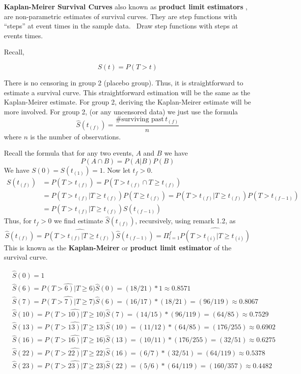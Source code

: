 \documentclass{article}
\begin{document}

 \textbf{Kaplan-Meirer Survival Curves } also known as \textbf{ product limit estimators }, are non-parametric estimates of survival curves. They are step functions with ``steps'' at event times in the sample data.
\NTS \, Draw step functions with steps at events times.

 Recall,

\[
S(t) = P(T>t)
\]

There is no censoring in group 2 (placebo group). Thus, it is straightforward to estimate a survival curve. This straightforward estimation will be the same as the Kaplan-Meirer estimate. For group 2, deriving the Kaplan-Meirer estimate will be more involved. For group 2, (or any uncensored data) we just use the formula
\[
\hat{S}(t_{(f)}) = \frac{\# \text{surviving past} \, t_{(f)}}{n}
\]
where $n$ is the number of observations.

 Recall the formula that for any two events, $A$ and $B$ we have
\[
P(A \cap B) = P(A|B)P(B)
\]
We have $S(0) = S(t_{(1)}) = 1$.
Now let $t_{f}>0$.
\begin{align*}
S(t_{(f)}) & = P(T > t_{(f)}) = P(T>t_{(f)} \cap T \ge t_{(f)}) \\
& = P(T>t_{(f)} | T \ge t_{(f)}) P(T \ge t_{(f)}) = P(T>t_{(f)} | T \ge t_{(f)}) P(T > t_{(f-1)})  \\
& = P(T>t_{(f)} | T \ge t_{(f)}) S(t_{(f-1)})
\end{align*}
Thus, for $t_{f}>0$ we find estimate  $\hat{S}(t_{(f)})$, recursively, using remark 1.2, as
\[
 \hat{S}(t_{(f)}) = \widehat{P(T>t_{(f)} | T \ge t_{(f)})} \hat{S}(t_{(f-1)}) = \Pi_{i=1}^f \hat{P(T>t_{(i)}|T \ge t_{(i)})}
 \]
This is known as the  \textbf{Kaplan-Meirer} or \textbf{ product limit estimator } of the survival curve.

\begin{align*}
&\hat{S}(0)=1 \\
&\hat{S}(6)=\hat{P(T>6)|T \ge 6)} \hat{S}(0) = (18/21)*1 \approx 0.8571 \\
&\hat{S}(7)=\hat{P(T>7)|T \ge 7)} \hat{S}(6) = (16/17)*(18/21) = (96/119) \approx 0.8067 \\
&\hat{S}(10)=\hat{P(T>10)|T \ge 10)} \hat{S}(7) = (14/15)*(96/119) = (64/85) \approx 0.7529 \\
&\hat{S}(13)=\hat{P(T>13)|T \ge 13)} \hat{S}(10) = (11/12)*(64/85) = (176/255) \approx 0.6902 \\
&\hat{S}(16)= \hat{P(T>16)|T \ge 16)} \hat{S}(13) = (10/11)*(176/255) = (32/51) \approx 0.6275 \\
&\hat{S}(22)= \hat{P(T>22)|T \ge 22)} \hat{S}(16) = (6/7)*(32/51) = (64/119) \approx 0.5378 \\
&\hat{S}(23)= \hat{P(T>23)|T \ge 23)} \hat{S}(22) = (5/6)*(64/119) = (160/357) \approx 0.4482 \
\end{align*}
\end{document}
